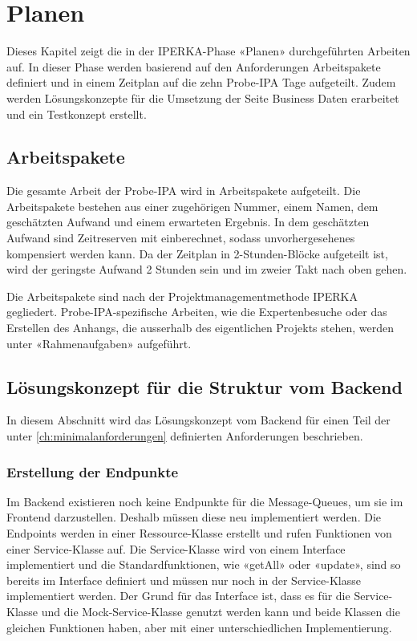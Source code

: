 \chapter{Planen}\label{ch:planen}
Dieses Kapitel zeigt die in der IPERKA-Phase «Planen» durchgeführten Arbeiten auf. In dieser Phase werden basierend auf den Anforderungen Arbeitspakete definiert und in einem Zeitplan auf die zehn Probe-IPA Tage aufgeteilt. Zudem werden Lösungskonzepte für die Umsetzung der Seite Business Daten erarbeitet und ein Testkonzept erstellt.

\section{Arbeitspakete}
Die gesamte Arbeit der Probe-IPA wird in Arbeitspakete aufgeteilt. Die Arbeitspakete bestehen aus einer zugehörigen Nummer, einem Namen, dem geschätzten Aufwand und einem erwarteten Ergebnis. In dem geschätzten Aufwand sind Zeitreserven mit einberechnet, sodass unvorhergesehenes kompensiert werden kann. Da der Zeitplan in 2-Stunden-Blöcke aufgeteilt ist, wird der geringste Aufwand 2 Stunden sein und im zweier Takt nach oben gehen.

Die Arbeitspakete sind nach der Projektmanagementmethode IPERKA gegliedert. Probe-IPA-spezifische Arbeiten, wie die Expertenbesuche oder das Erstellen des Anhangs, die ausserhalb des eigentlichen Projekts stehen, werden unter «Rahmenaufgaben» aufgeführt.


\section{Lösungskonzept für die Struktur vom Backend}
In diesem Abschnitt wird das Lösungskonzept vom Backend für einen Teil der unter \ref{ch:minimalanforderungen} definierten Anforderungen beschrieben.

\subsection{Erstellung der Endpunkte}
Im Backend existieren noch keine Endpunkte für die Message-Queues, um sie im Frontend darzustellen. Deshalb müssen diese neu implementiert werden. Die Endpoints werden in einer Ressource-Klasse erstellt und rufen Funktionen von einer Service-Klasse auf. Die Service-Klasse wird von einem Interface implementiert und die Standardfunktionen, wie «getAll» oder «update», sind so bereits im Interface definiert und müssen nur noch in der Service-Klasse implementiert werden. Der Grund für das Interface ist, dass es für die Service-Klasse und die Mock-Service-Klasse genutzt werden kann und beide Klassen die gleichen Funktionen haben, aber mit einer unterschiedlichen Implementierung.

